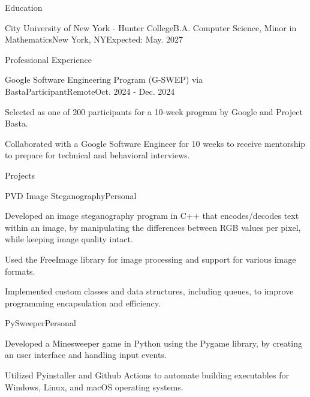 \documentclass[]{rh-resume}
\begin{document}
\resumeheader
{}
{}
{}
{}
{}

\begin{section}{Education}
    \begin{subsectionnobullet}{City University of New York - Hunter College}{B.A. Computer Science, Minor in Mathematics}{New York, NY}{Expected: May. 2027}
    \end{subsectionnobullet}
\end{section}

\begin{section}{Professional Experience}
    \begin{subsection}{Google Software Engineering Program (G-SWEP) via Basta}{Participant}{Remote}{Oct. 2024 - Dec. 2024}
        \item Selected as one of 200 participants for a 10-week program by Google and Project Basta.
        \item Collaborated with a Google Software Engineer for 10 weeks to receive mentorship to prepare for technical and behavioral interviews.
    \end{subsection}
\end{section}

\begin{section}{Projects}

\begin{subsectionproject}{PVD Image Steganography}{Personal}{}
    \item{Developed an image steganography program in C++ that encodes/decodes text within an image, by manipulating the differences between RGB values per pixel, while keeping image quality intact.}
    \item{Used the FreeImage library for image processing and support for various image formats.}
    \item{Implemented custom classes and data structures, including queues, to improve programming encapsulation and efficiency. }    
\end{subsectionproject}

\begin{subsectionproject}{PySweeper}{Personal}{}
    \item{Developed a Minesweeper game in Python using the Pygame library, by creating an user interface and handling input events.}
    \item{Utilized Pyinstaller and Github Actions to automate building executables for Windows, Linux, and macOS operating systems.}
\end{subsectionproject}

\end{section}
\end{document}
